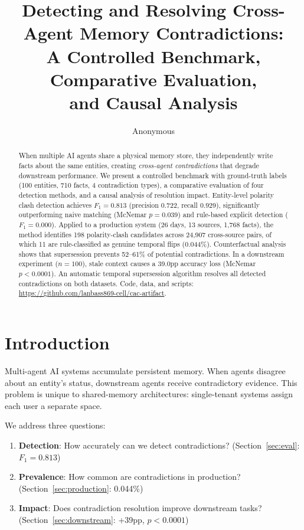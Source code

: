 \documentclass{article}
\title{Detecting and Resolving Cross-Agent Memory Contradictions:\\A Controlled Benchmark, Comparative Evaluation,\\and Causal Analysis}
\author{Anonymous}
\date{}
\begin{document}
\maketitle


\begin{abstract}
When multiple AI agents share a physical memory store, they independently write facts about the same entities, creating \emph{cross-agent contradictions} that degrade downstream performance. We present a controlled benchmark with ground-truth labels (100 entities, 710 facts, 4 contradiction types), a comparative evaluation of four detection methods, and a causal analysis of resolution impact. Entity-level polarity clash detection achieves $F_1 = 0.813$ (precision 0.722, recall 0.929), significantly outperforming naive matching (McNemar $p = 0.039$) and rule-based explicit detection ($F_1 = 0.000$). Applied to a production system (26 days, 13 sources, 1{,}768 facts), the method identifies 198 polarity-clash candidates across 24{,}907 cross-source pairs, of which 11 are rule-classified as genuine temporal flips (0.044\%). Counterfactual analysis shows that supersession prevents 52--61\% of potential contradictions. In a downstream experiment ($n{=}100$), stale context causes a 39.0pp accuracy loss (McNemar $p < 0.0001$). An automatic temporal supersession algorithm resolves all detected contradictions on both datasets. Code, data, and scripts: \url{https://github.com/lanbass869-cell/cac-artifact}.
\end{abstract}


\section{Introduction}
Multi-agent AI systems accumulate persistent memory. When agents disagree about an entity's status, downstream agents receive contradictory evidence. This problem is unique to shared-memory architectures: single-tenant systems assign each user a separate space.

We address three questions:
\begin{enumerate}
\item \textbf{Detection}: How accurately can we detect contradictions? (Section~\ref{sec:eval}: $F_1 = 0.813$)
\item \textbf{Prevalence}: How common are contradictions in production? (Section~\ref{sec:production}: 0.044\%)
\item \textbf{Impact}: Does contradiction resolution improve downstream tasks? (Section~\ref{sec:downstream}: +39pp, $p < 0.0001$)
\end{enumerate}
\end{document}
